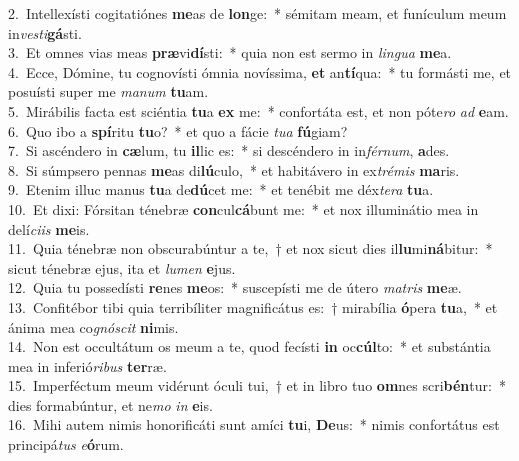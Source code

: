 {2.~}Intellexísti cogitatiónes \textbf{me}as de \textbf{lon}ge:~* sémitam meam, et funículum meum in\textit{ve}\textit{sti}\textbf{gá}sti.\\
{3.~}Et omnes vias meas \textbf{præ}vi\textbf{dí}sti:~* quia non est sermo in \textit{lin}\textit{gua} \textbf{me}a.\\
{4.~}Ecce, Dómine, tu cognovísti ómnia novíssima, \textbf{et} an\textbf{tí}qua:~* tu formásti me, et posuísti super me \textit{ma}\textit{num} \textbf{tu}am.\\
{5.~}Mirábilis facta est sciéntia \textbf{tu}a \textbf{ex} me:~* confortáta est, et non póte\textit{ro} \textit{ad} \textbf{e}am.\\
{6.~}Quo ibo a \textbf{spí}ritu \textbf{tu}o?~* et quo a fácie \textit{tu}\textit{a} \textbf{fú}giam?\\
{7.~}Si ascéndero in \textbf{cæ}lum, tu \textbf{il}lic es:~* si descéndero in in\textit{fér}\textit{num}, \textbf{a}des.\\
{8.~}Si súmpsero pennas \textbf{me}as di\textbf{lú}culo,~* et habitávero in ex\textit{tré}\textit{mis} \textbf{ma}ris.\\
{9.~}Etenim illuc manus \textbf{tu}a de\textbf{dú}cet me:~* et tenébit me déx\textit{te}\textit{ra} \textbf{tu}a.\\
{10.~}Et dixi: Fórsitan ténebræ \textbf{con}cul\textbf{cá}bunt me:~* et nox illuminátio mea in delí\textit{ci}\textit{is} \textbf{me}is.\\
{11.~}Quia ténebræ non obscurabúntur a te,~† et nox sicut dies il\textbf{lu}mi\textbf{ná}bitur:~* sicut ténebræ ejus, ita et \textit{lu}\textit{men} \textbf{e}jus.\\
{12.~}Quia tu possedísti \textbf{re}nes \textbf{me}os:~* suscepísti me de útero \textit{ma}\textit{tris} \textbf{me}æ.\\
{13.~}Confitébor tibi quia terribíliter magnificátus es:~† mirabília \textbf{ó}pera \textbf{tu}a,~* et ánima mea co\textit{gnó}\textit{scit} \textbf{ni}mis.\\
{14.~}Non est occultátum os meum a te, quod fecísti \textbf{in} oc\textbf{cúl}to:~* et substántia mea in inferió\textit{ri}\textit{bus} \textbf{ter}ræ.\\
{15.~}Imperféctum meum vidérunt óculi tui,~† et in libro tuo \textbf{om}nes scri\textbf{bén}tur:~* dies formabúntur, et ne\textit{mo} \textit{in} \textbf{e}is.\\
{16.~}Mihi autem nimis honorificáti sunt amíci \textbf{tu}i, \textbf{De}us:~* nimis confortátus est principá\textit{tus} \textit{e}\textbf{ó}rum.\\
